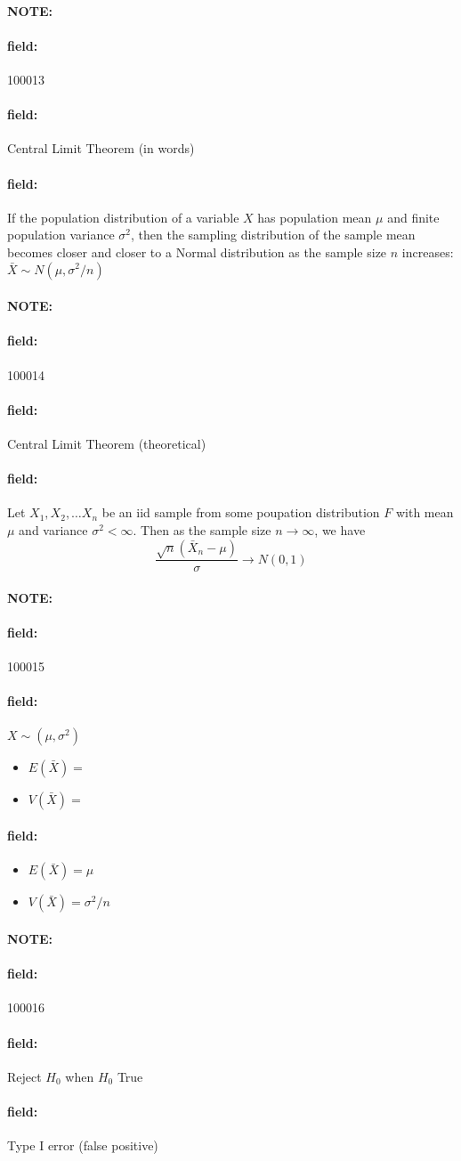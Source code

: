 \documentclass[12pt]{article}
\newenvironment{note}{\paragraph{NOTE:}}{}
\newenvironment{field}{\paragraph{field:}}{}
\begin{document}
\begin{note} \begin{field} \tiny 100013 \end{field}
 \begin{field}
  Central Limit Theorem (in words)
 \end{field}
 \begin{field}
  If the population distribution of a variable $X$ has population mean $\mu$ and finite population variance $\sigma^2$, then the sampling distribution of the sample mean becomes closer and closer to a Normal distribution as the sample size $n$ increases: $\bar{X} \sim N(\mu,\sigma^2/n)$
 \end{field}
\end{note}

\begin{note} \begin{field} \tiny 100014 \end{field}
 \begin{field}
  Central Limit Theorem (theoretical)
 \end{field}
 \begin{field}
  Let $X_1, X_2, \ldots X_n$ be an iid sample from some poupation distribution $F$ with mean $\mu$ and variance $\sigma^2 < \infty$. Then as the sample size $n \to \infty$, we have $$\frac{\sqrt{n}(\bar{X}_n - \mu)}{\sigma} \to N(0,1)$$
 \end{field}
\end{note}

\begin{note} \begin{field} \tiny 100015 \end{field}
 \begin{field}
  $X \sim (\mu,\sigma^2)$
  \begin{itemize}
   \item $E(\bar{X}) = $
   \item $V(\bar{X}) = $
  \end{itemize}
 \end{field}
 \begin{field}
  \begin{itemize}
   \item $E(\bar{X}) = \mu$
   \item $V(\bar{X}) = \sigma^2/n$
  \end{itemize}
 \end{field}
\end{note}

\begin{note} \begin{field} \tiny 100016 \end{field}
 \begin{field}
  Reject $H_0$ when $H_0$ True
 \end{field}
 \begin{field}
  Type I error (false positive)
 \end{field}
\end{note}
\end{document}

